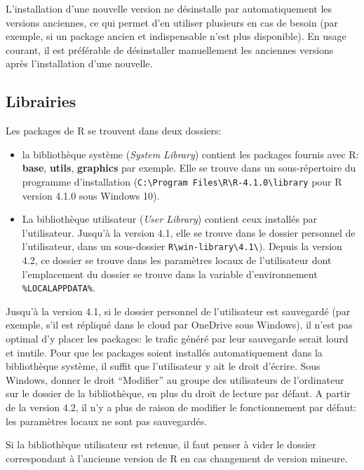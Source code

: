 \documentclass[
  12pt,
  french,
  a4paper,
  extrafontsizes,onecolumn,openright
  ]{memoir}
\providecommand{\tightlist}{%
  \setlength{\itemsep}{0pt}\setlength{\parskip}{0pt}}
\begin{document}
L'installation d'une nouvelle version ne désinstalle par automatiquement les versions anciennes, ce qui permet d'en utiliser plusieurs en cas de besoin (par exemple, si un package ancien et indispensable n'est plus disponible).
En usage courant, il est préférable de désinstaller manuellement les anciennes versions après l'installation d'une nouvelle.

\subsection{Librairies}\label{sec:librairies}

Les packages de R se trouvent dans deux dossiers:

\begin{itemize}
\tightlist
\item
  la bibliothèque système (\emph{System Library}) contient les packages fournis avec R: \textbf{base}, \textbf{utils}, \textbf{graphics} par exemple.
  Elle se trouve dans un sous-répertoire du programme d'installation (\texttt{C:\textbackslash{}Program\ Files\textbackslash{}R\textbackslash{}R-4.1.0\textbackslash{}library} pour R version 4.1.0 sous Windows 10).
\item
  La bibliothèque utilisateur (\emph{User Library}) contient ceux installés par l'utilisateur.
  Jusqu'à la version 4.1, elle se trouve dans le dossier personnel de l'utilisateur, dans un sous-dossier \texttt{R\textbackslash{}win-library\textbackslash{}4.1\textbackslash{}}).
  Depuis la version 4.2, ce dossier se trouve dans les paramètres locaux de l'utilisateur dont l'emplacement du dossier se trouve dans la variable d'environnement \texttt{\%LOCALAPPDATA\%}.
\end{itemize}

Jusqu'à la version 4.1, si le dossier personnel de l'utilisateur est sauvegardé (par exemple, s'il est répliqué dans le cloud par OneDrive sous Windows), il n'est pas optimal d'y placer les packages: le trafic généré par leur sauvegarde serait lourd et inutile.
Pour que les packages soient installés automatiquement dans la bibliothèque système, il suffit que l'utilisateur y ait le droit d'écrire.
Sous Windows, donner le droit \enquote{Modifier} au groupe des utilisateurs de l'ordinateur sur le dossier de la bibliothèque, en plus du droit de lecture par défaut.
A partir de la version 4.2, il n'y a plus de raison de modifier le fonctionnement par défaut: les paramètres locaux ne sont pas sauvegardés.

Si la bibliothèque utilisateur est retenue, il faut penser à vider le dossier correspondant à l'ancienne version de R en cas changement de version mineure.
\end{document}
